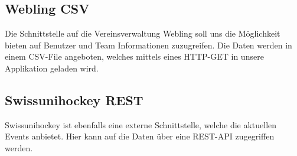 		\subsection{Webling CSV}
		Die Schnittstelle auf die Vereinsverwaltung Webling soll uns die Möglichkeit bieten auf Benutzer und Team Informationen zuzugreifen. Die Daten werden in einem CSV-File angeboten, welches mittels eines HTTP-GET in unsere Applikation geladen wird.

		\subsection{Swissunihockey REST}
		Swissunihockey ist ebenfalls eine externe Schnittstelle, welche die aktuellen Events anbietet. Hier kann auf die Daten über eine REST-API zugegriffen werden.